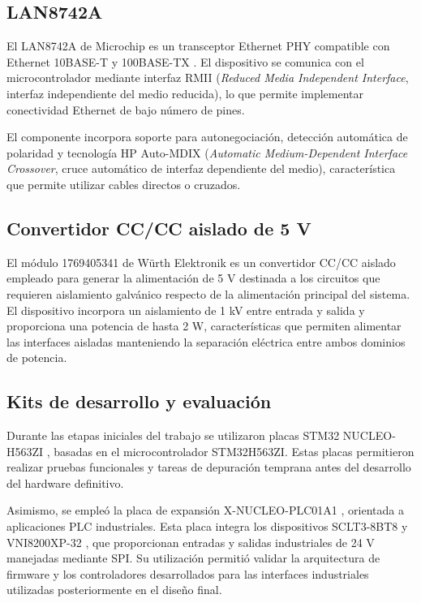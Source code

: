 \subsection{LAN8742A}

El LAN8742A de Microchip es un transceptor Ethernet PHY compatible con Ethernet 10BASE-T y 100BASE-TX \cite{lan8742a}. El dispositivo se comunica con el microcontrolador mediante interfaz RMII (\textit{Reduced Media Independent Interface}, interfaz independiente del medio reducida), lo que permite implementar conectividad Ethernet de bajo número de pines.

El componente incorpora soporte para autonegociación, detección automática de polaridad y tecnología HP Auto-MDIX (\textit{Automatic Medium-Dependent Interface Crossover}, cruce automático de interfaz dependiente del medio), característica que permite utilizar cables directos o cruzados.

\subsection{Convertidor CC/CC aislado de 5 V}

El módulo 1769405341 de Würth Elektronik \cite{wurth1769405341} es un convertidor CC/CC aislado empleado para generar la alimentación de 5 V destinada a los circuitos que requieren aislamiento galvánico respecto de la alimentación principal del sistema. El dispositivo incorpora un aislamiento de 1 kV entre entrada y salida y proporciona una potencia de hasta 2 W, características que permiten alimentar las interfaces aisladas manteniendo la separación eléctrica entre ambos dominios de potencia.

\subsection{Kits de desarrollo y evaluación}

Durante las etapas iniciales del trabajo se utilizaron placas STM32 NUCLEO-H563ZI \cite{nucleoh563}, basadas en el microcontrolador STM32H563ZI. Estas placas permitieron realizar pruebas funcionales y tareas de depuración temprana antes del desarrollo del hardware definitivo.

Asimismo, se empleó la placa de expansión X-NUCLEO-PLC01A1 \cite{nucleoplc}, orientada a aplicaciones PLC industriales. Esta placa integra los dispositivos SCLT3-8BT8 \cite{sclt38bt8} y VNI8200XP-32 \cite{vni8200xp32}, que proporcionan entradas y salidas industriales de 24 V manejadas mediante SPI. Su utilización permitió validar la arquitectura de firmware y los controladores desarrollados para las interfaces industriales utilizadas posteriormente en el diseño final.

